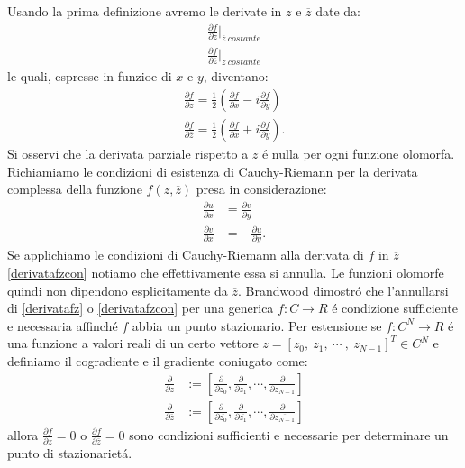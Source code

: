 \documentclass[a4paper,10pt]{article}
\begin{document}
 Usando la prima definizione avremo le derivate in $z$ e $\overline{z}$ date da:
 \begin{align}
  \frac{\partial f}{\partial z}\bigg|_{\overline{z} \ costante}\\
  \frac{\partial f}{\partial \overline{z}}\bigg|_{z \ costante}
 \end{align}
 le quali, espresse in funzioe di $x$ e $y$, diventano:
 \begin{align}
  \frac{\partial f}{\partial z} = \frac{1}{2}\left(\frac{\partial f}{\partial x}-i\frac{\partial f}{\partial y}\right)\label{derivatafz}\\
  \frac{\partial f}{\partial \overline{z}} = \frac{1}{2}\left(\frac{\partial f}{\partial x}+i\frac{\partial f}{\partial y}\right).\label{derivatafzcon}
 \end{align}
 Si osservi che la derivata parziale rispetto a $\overline{z}$ \'e nulla per ogni funzione olomorfa. Richiamiamo le condizioni di esistenza di Cauchy-Riemann per la derivata complessa della funzione $f(z,\overline{z})$ presa in considerazione:
 \begin{align}
  \frac{\partial u}{\partial x} &= \frac{\partial v}{\partial y}\\
  \frac{\partial v}{\partial x} &=- \frac{\partial u}{\partial y}.
 \end{align}
 Se applichiamo le condizioni di Cauchy-Riemann alla derivata di $f$ in $\overline{z}$ \ref{derivatafzcon} notiamo che effettivamente essa si annulla. Le funzioni olomorfe quindi non dipendono esplicitamente da $\overline{z}$. Brandwood dimostr\'o che l'annullarsi di \ref{derivatafz} o \ref{derivatafzcon} per una generica $f:C\rightarrow R$ \'e condizione sufficiente e necessaria affinch\'e $f$ abbia un punto stazionario. Per estensione se $f:C^N\rightarrow R$ \'e una funzione a valori reali di un certo vettore $z=\left[ z_0, \ z_1, \ \cdots \ , \ z_{N-1}\right]^T \in C^N$ e definiamo il cogradiente e il gradiente coniugato come:
 \begin{align}
  \frac{\partial}{\partial z} &:=\left[ \frac{\partial}{\partial z_0},\frac{\partial}{\partial z_1},\cdots ,\frac{\partial}{\partial z_{N-1}}\right]\\
  \frac{\partial}{\partial \overline{z}} &:=\left[ \frac{\partial}{\partial \overline{z_0}},\frac{\partial}{\partial \overline{z_1}},\cdots ,\frac{\partial}{\partial \overline{z_{N-1}}}\right]
 \end{align}
 allora $\frac{\partial f}{\partial z}=0$ o $\frac{\partial f}{\partial \overline{z}}=0$ sono condizioni sufficienti e necessarie per determinare un punto di stazionariet\'a. 
\end{document}
